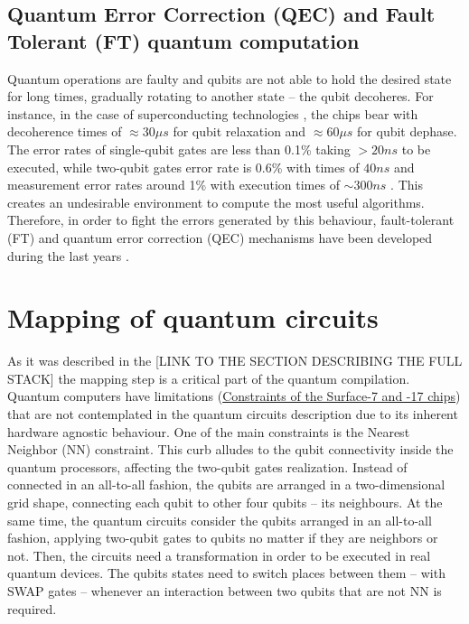 \subsection*{Quantum Error Correction (QEC) and Fault Tolerant (FT) quantum computation}
\label{sec:org919a89e}
Quantum operations are faulty and qubits are not able to hold the desired state for long times, gradually rotating to another state -- the qubit decoheres.
For instance, in the case of superconducting technologies \cite{O_Brien_2017}, the chips bear with decoherence times of \(\approx 30 \mu s\) for qubit relaxation and \(\approx 60 \mu s\) for qubit dephase.
The error rates of single-qubit gates are less than 0.1\% taking \(> 20 ns\) to be executed, while two-qubit gates error rate is 0.6\% with times of \(40 ns\) and measurement error rates around 1\% with execution times of \(\sim 300 ns\) \cite{O_Brien_2017,Versluis_2017}.
This creates an undesirable environment to compute the most useful algorithms.
Therefore, in order to fight the errors generated by this behaviour, fault-tolerant (FT) and quantum error correction (QEC) mechanisms have been developed during the last years \cite{Nielsen_2009}.

\section*{Mapping of quantum circuits}
\label{sec:org00635cb}

As it was described in the [LINK TO THE SECTION DESCRIBING THE FULL STACK] the mapping step is a critical part of the quantum compilation.
Quantum computers have limitations (\href{chapter-3.org}{Constraints of the Surface-7 and -17 chips}) that are not contemplated in the quantum circuits description due to its inherent hardware agnostic behaviour.
One of the main constraints is the Nearest Neighbor (NN) constraint.
This curb alludes to the qubit connectivity inside the quantum processors, affecting the two-qubit gates realization.
Instead of connected in an all-to-all fashion, the qubits are arranged in a two-dimensional grid shape, connecting each qubit to other four qubits -- its neighbours.
At the same time, the quantum circuits consider the qubits arranged in an all-to-all fashion, applying two-qubit gates to qubits no matter if they are neighbors or not.
Then, the circuits need a transformation in order to be executed in real quantum devices.
The qubits states need to switch places between them -- with SWAP gates -- whenever an interaction between two qubits that are not NN is required. 

